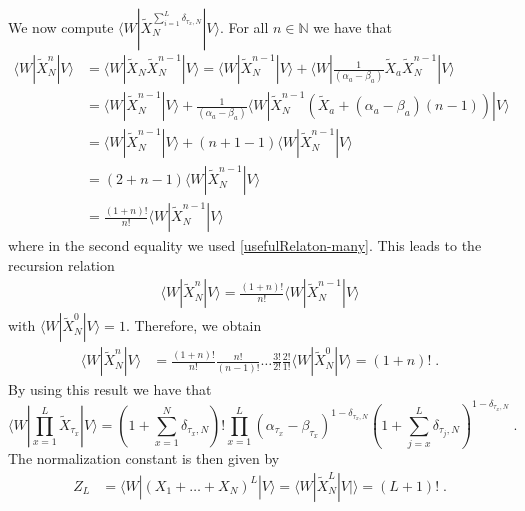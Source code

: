 \documentclass[10pt]{article}
\numberwithin{equation}{section}
\numberwithin{equation}{subsection}
\newcommand{\dt}{\;.}
\begin{document}
We now compute $\langle W|\widetilde{X}_{N}^{\sum_{i=1}^{L}\delta_{\tau_{x},N}}|V\rangle$. For all $n\in \mathbb{N}$ we have that  
\begin{align}
	\langle W|\widetilde{X}_{N}^{n}|V\rangle&=\langle W|\widetilde{X}_{N}\widetilde{X}_{N}^{n-1}|V\rangle=\langle W|\widetilde{X}_{N}^{n-1}|V\rangle +\langle W|\frac{1}{(\alpha_{a}-\beta_{a})}\widetilde{X}_{a}\widetilde{X}_{N}^{n-1}|V\rangle\nonumber
	\\&=
	\langle W|\widetilde{X}_{N}^{n-1}|V\rangle+\frac{1}{(\alpha_{a}-\beta_{a})}\langle W|\widetilde{X}_{N}^{n-1}\left(\widetilde{X}_{a}+(\alpha_{a}-\beta_{a})(n-1)\right)|V\rangle\nonumber
	\\&=
	\langle W|\widetilde{X}_{N}^{n-1}|V\rangle+\left(n+1-1\right)\langle W|\widetilde{X}_{N}^{n-1}|V\rangle\nonumber
	\\&=
	\left(2+n-1\right)\langle W|\widetilde{X}_{N}^{n-1}|V\rangle\nonumber
	\\&=
	\frac{(1+n)!}{n!}\langle W|\widetilde{X}_{N}^{n-1}|V\rangle
\end{align}
where in the second equality we used \eqref{usefulRelaton-many}. 
This leads to the recursion relation
\begin{align}
		\langle W|\widetilde{X}_{N}^{n}|V\rangle=\frac{(1+n)!}{n!}\langle W|\widetilde{X}_{N}^{n-1}|V\rangle
\end{align}
with $	\langle W|\widetilde{X}_{N}^{0}|V\rangle=1$. 
Therefore, we obtain 
\begin{align}
	\langle W|\widetilde{X}_{N}^{n}|V\rangle&=%
	\frac{(1+n)!}{n!}\frac{n!}{(n-1)!}\ldots \frac{3!}{2!}\frac{2!}{1!}\langle W|\widetilde{X}_{N}^{0}|V\rangle=
	(1+n)!\dt
\end{align}
By using this result we have that
\begin{equation}
	\langle W|\prod_{x=1}^{L}\widetilde{X}_{\tau_{x}}
	|V \rangle=(1+\sum_{x=1}^{N}\delta_{\tau_{x},N})!\prod_{x=1}^{L}\left(\alpha_{\tau_{x}}-\beta_{\tau_{x}}\right)^{1-\delta_{\tau_{x},N}}\left(1+\sum_{j=x}^{L}\delta_{\tau_{j},N}\right)^{1-\delta_{\tau_{x},N}}\dt
\end{equation}
The normalization constant is then given by
\begin{align}
	Z_{L}&=\langle W|(X_{1}+\ldots+X_{N})^{L}|V\rangle=\langle W|\widetilde{X}_{N}^{L}|V|\rangle=
	(L+1)!\dt
\end{align}
\end{document}
